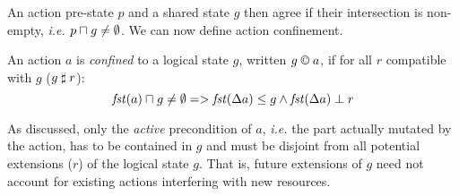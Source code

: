 An action pre-state $p$ and a shared state $g$ then agree if their intersection is non-empty, \textit{i.e.} $p \sqcap_{} g \not= \emptyset$. We can now define action confinement.
%
%
\begin{definition}\label{def:actconf}
An action $a$ is \emph{confined} to a logical state $g$, written $g\containI a$, if for all $r$ compatible with $g$ ($g \mathrel{\sharp} r$):
%
\[
	\mathit{fst}(a)\sqcap_{} g \neq\emptyset => \mathit{fst}(\Delta {a})\leq g \land \mathit{fst}(\Delta {a}) \mathrel{\bot} r
\]
\end{definition}
%
As discussed, only the \emph{active} precondition of $a$, \textit{i.e.} the part actually mutated by the action, has to be contained in $g$ and must be disjoint from all potential extensions ($r$) of the logical state $g$. That is, future extensions of $g$ need not account for existing actions interfering with new resources.\\

